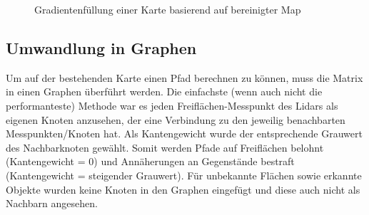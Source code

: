 \begin{figure}
\caption{Gradientenfüllung einer Karte basierend auf bereinigter Map}
\end{figure}



\subsection{Umwandlung in Graphen}

Um auf der bestehenden Karte einen Pfad berechnen zu können, muss die Matrix in einen Graphen überführt werden. Die einfachste (wenn auch nicht die performanteste) Methode war es jeden Freiflächen-Messpunkt des Lidars als eigenen Knoten anzusehen, der eine Verbindung zu den jeweilig benachbarten Messpunkten/Knoten hat. Als Kantengewicht wurde der entsprechende Grauwert des Nachbarknoten gewählt. Somit werden Pfade auf Freiflächen belohnt (Kantengewicht = 0) und Annäherungen an Gegenstände bestraft (Kantengewicht = steigender Grauwert). 
Für unbekannte Flächen sowie erkannte Objekte wurden keine Knoten in den Graphen eingefügt und diese auch nicht als Nachbarn angesehen. 

